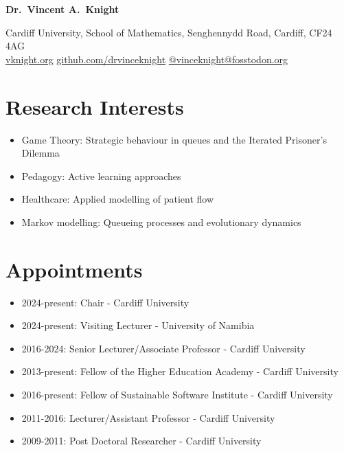 \documentclass[10pt]{article}
\begin{document}
{\LARGE \textbf{Dr.\ Vincent A.\ Knight}}

\medskip
Cardiff University, School of Mathematics, Senghennydd Road, Cardiff, CF24 4AG\\
\href{https://vknight.org}{vknight.org} \quad
\href{https://github.com/drvinceknight}{github.com/drvinceknight} \quad
\href{https://fosstodon.org/@vinceknight}{@vinceknight@fosstodon.org}

\bigskip

\section{Research Interests}

\begin{itemize}

  \item Game Theory: Strategic behaviour in queues and the Iterated Prisoner's Dilemma

  \item Pedagogy: Active learning approaches

  \item Healthcare: Applied modelling of patient flow

  \item Markov modelling: Queueing processes and evolutionary dynamics

\end{itemize}

\section{Appointments}

\begin{itemize}

  \item 2024-present: Chair - Cardiff University 

  \item 2024-present: Visiting Lecturer - University of Namibia 

  \item 2016-2024: Senior Lecturer/Associate Professor - Cardiff University 

  \item 2013-present: Fellow of the Higher Education Academy - Cardiff University 

  \item 2016-present: Fellow of Sustainable Software Institute - Cardiff University 

  \item 2011-2016: Lecturer/Assistant Professor - Cardiff University 

  \item 2009-2011: Post Doctoral Researcher - Cardiff University 

\end{itemize}
\end{document}
